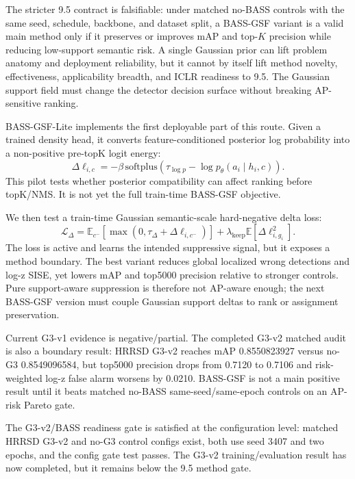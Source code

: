 \documentclass[10pt]{article}
\begin{document}
The stricter 9.5 contract is falsifiable: under matched no-BASS controls with
the same seed, schedule, backbone, and dataset split, a BASS-GSF variant is a
valid main method only if it preserves or improves mAP and top-$K$ precision
while reducing low-support semantic risk.  A single Gaussian prior can lift
problem anatomy and deployment reliability, but it cannot by itself lift method
novelty, effectiveness, applicability breadth, and ICLR readiness to 9.5.  The
Gaussian support field must change the detector decision surface without
breaking AP-sensitive ranking.

BASS-GSF-Lite implements the first deployable part of this route.  Given a
trained density head, it converts feature-conditioned posterior log probability
into a non-positive pre-topK logit energy:
\begin{equation}
  \Delta \ell_{i,c} =
  -\beta\,\mathrm{softplus}(\tau_{\log p} -
  \log p_\theta(a_i\mid h_i,c)).
\end{equation}
This pilot tests whether posterior compatibility can affect ranking before
topK/NMS.  It is not yet the full train-time BASS-GSF objective.

We then test a train-time Gaussian semantic-scale hard-negative delta loss:
\begin{equation}
  \mathcal{L}_{\Delta} =
  \mathbb{E}_{c^-}\left[\max(0,\tau_{\Delta}+\Delta\ell_{i,c^-})\right]
  + \lambda_{\mathrm{keep}}\mathbb{E}\left[\Delta\ell_{i,g_i}^{2}\right].
\end{equation}
The loss is active and learns the intended suppressive signal, but it exposes a
method boundary.  The best variant reduces global localized wrong detections
and log-z SISE, yet lowers mAP and top5000 precision relative to stronger
controls.  Pure support-aware suppression is therefore not AP-aware enough;
the next BASS-GSF version must couple Gaussian support deltas to rank or
assignment preservation.

Current G3-v1 evidence is negative/partial.  The completed G3-v2 matched audit
is also a boundary result: HRRSD G3-v2 reaches mAP 0.8550823927 versus no-G3
0.8549096584, but top5000 precision drops from 0.7120 to 0.7106 and
risk-weighted log-z false alarm worsens by 0.0210.  BASS-GSF is not a main
positive result until it beats matched no-BASS same-seed/same-epoch controls on
an AP-risk Pareto gate.

The G3-v2/BASS readiness gate is satisfied at the configuration level: matched
HRRSD G3-v2 and no-G3 control configs exist, both use seed 3407 and two epochs,
and the config gate test passes.  The G3-v2 training/evaluation result has now
completed, but it remains below the 9.5 method gate.
\end{document}
